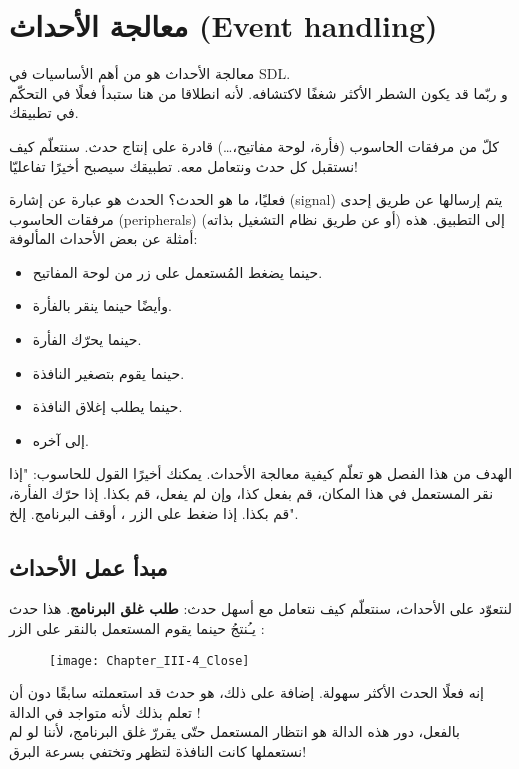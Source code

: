 \chapter{معالجة الأحداث (\textenglish{Event handling})}

معالجة الأحداث هو من أهم الأساسيات في \textenglish{SDL}.\\
و ربّما قد يكون الشطر الأكثر شغفًا لاكتشافه. لأنه انطلاقا من هنا ستبدأ فعلًا في التحكّم في تطبيقك.

كلّ من مرفقات الحاسوب (فأرة، لوحة مفاتيح،\dots) قادرة على إنتاج حدث. سنتعلّم كيف نستقبل كل حدث ونتعامل معه. تطبيقك سيصبح أخيرًا تفاعليّا!

فعليًا، ما هو الحدث؟ الحدث هو عبارة عن إشارة
(\textenglish{signal})
يتم إرسالها عن طريق إحدى مرفقات الحاسوب 
(\textenglish{peripherals})
(أو عن طريق نظام التشغيل بذاته) إلى التطبيق. هذه أمثلة عن بعض الأحداث المألوفة:

\begin{itemize}
	\item حينما يضغط المُستعمل على زر من لوحة المفاتيح.
	\item وأيضًا حينما ينقر بالفأرة.
	\item حينما يحرّك الفأرة.
	\item حينما يقوم بتصغير النافذة.
	\item حينما يطلب إغلاق النافذة.
	\item إلى آخره.
\end{itemize}

الهدف من هذا الفصل هو تعلّم كيفية معالجة الأحداث. يمكنك أخيرًا القول للحاسوب: "إذا نقر المستعمل في هذا المكان، قم بفعل كذا، وإن لم يفعل، قم بكذا. إذا حرّك الفأرة، قم بكذا. إذا ضغط على الزر
،
أوقف البرنامج. إلخ".

\section{مبدأ عمل الأحداث}

لنتعوّد على الأحداث، سنتعلّم كيف نتعامل مع أسهل حدث:
\textbf{طلب غلق البرنامج}.
هذا حدث يـُنتجُ حينما يقوم المستعمل بالنقر على الزر
:

\begin{figure}[H]
	\centering
	\texttt{[image: Chapter\_III-4\_Close]}
\end{figure}

إنه فعلًا الحدث الأكثر سهولة. إضافة على ذلك، هو حدث قد استعملته سابقًا دون أن تعلم بذلك لأنه متواجد في الدالة 
!\\
بالفعل، دور هذه الدالة هو انتظار المستعمل حتّى يقررّ غلق البرنامج، لأننا لو لم نستعملها كانت النافذة لتظهر وتختفي بسرعة البرق!

